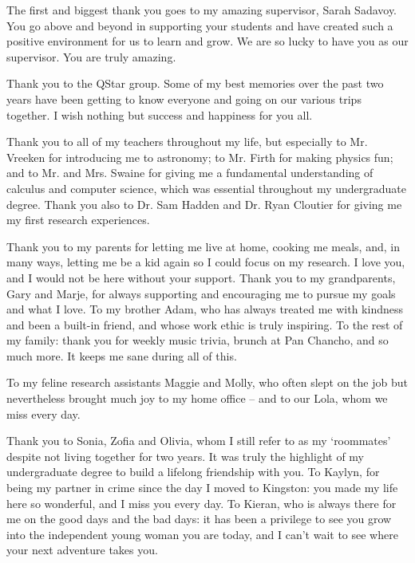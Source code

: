
The first and biggest thank you goes to my amazing supervisor, Sarah Sadavoy. You go above and beyond in supporting your students and have created such a positive environment for us to learn and grow. We are so lucky to have you as our supervisor. You are truly amazing.

Thank you to the QStar group. Some of my best memories over the past two years have been getting to know everyone and going on our various trips together. I wish nothing but success and happiness for you all.

Thank you to all of my teachers throughout my life, but especially to Mr. Vreeken for introducing me to astronomy; to Mr. Firth for making physics fun; 
and to Mr. and Mrs. Swaine for giving me a fundamental understanding of calculus and computer science, which was essential throughout my undergraduate degree. Thank you also to Dr. Sam Hadden and Dr. Ryan Cloutier for giving me my first research experiences. 

Thank you to my parents for letting me live at home, cooking me meals, and, in many ways, letting me be a kid again so I could focus on my research. I love you, and I would not be here without your support. Thank you to my grandparents, Gary and Marje, for always supporting and encouraging me to pursue my goals and what I love. To my brother Adam, who has always treated me with kindness and been a built-in friend, and whose work ethic is truly inspiring. To the rest of my family: thank you for weekly music trivia, brunch at Pan Chancho, and so much more. It keeps me sane during all of this. 

To my feline research assistants Maggie and Molly, who often slept on the job but nevertheless brought much joy to my home office -- and to our Lola, whom we miss every day. 

Thank you to Sonia, Zofia and Olivia, whom I still refer to as my `roommates' despite not living together for two years. It was truly the highlight of my undergraduate degree to build a lifelong friendship with you. To Kaylyn, for being my partner in crime since the day I moved to Kingston: you made my life here so wonderful, and I miss you every day. 
To Kieran, who is always there for me on the good days and the bad days: it has been a privilege to see you grow into the independent young woman you are today, and I can't wait to see where your next adventure takes you.


